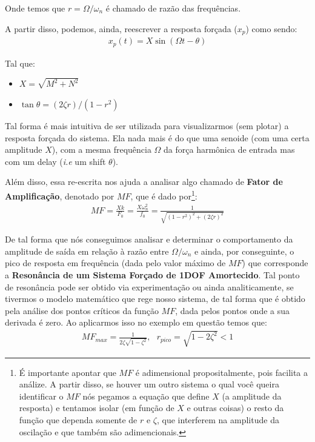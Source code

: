 \documentclass{article}
\begin{document}
Onde temos que $r = \Omega / \omega_n$ é chamado de razão das frequências.

A partir disso, podemos, ainda, reescrever a resposta forçada ($x_p$) como sendo:
\begin{align}
    x_p(t) = X\sin(\Omega t - \theta)
\end{align}

Tal que:
\begin{itemize}
    \item $X = \sqrt{M^2 + N^2}$
    \item $\tan{\theta} = (2\zeta r)/(1-r^2)$
\end{itemize}

Tal forma é mais intuitiva de ser utilizada para visualizarmos (sem plotar) a resposta forçada do sistema. Ela nada mais é do que uma senoide (com uma certa amplitude $X$), com a mesma
frequência $\Omega$ da força harmônica de entrada mas com um delay (\emph{i.e} um shift $\theta$).

Além disso, essa re-escrita nos ajuda a analisar algo chamado de \textbf{Fator de Amplificação}, denotado por \textbf{$MF$}, que é dado por\footnote{É importante apontar que $MF$ é
    adimensional propositalmente, pois facilita a análize. A partir disso, se houver um outro sistema o qual você queira identificar o $MF$ nós pegamos a equação que define $X$ (a amplitude da
    resposta) e tentamos isolar (em função de $X$ e outras coisas) o resto da função que dependa somente de $r$ e $\zeta$, que interferem na amplitude da oscilação e que também são adimencionais.}:
\begin{align}
    MF = \frac{Xk}{F_0} = \frac{X\omega_n^2}{f_0} = \frac{1}{\sqrt{(1 - r^2)^2 + (2\zeta r)^2}}\label{eq:fator_de_amplificacao}
\end{align}

De tal forma que nós conseguimos analisar e determinar o comportamento da amplitude de saída em relação à razão entre $\Omega/\omega_n$ e ainda, por conseguinte, o pico de resposta em frequência (dada pelo valor máximo de $MF$) que corresponde a \textbf{Resonância de um Sistema Forçado de 1DOF
    Amortecido}. Tal ponto de resonância pode ser obtido via experimentação ou ainda analiticamente, se tivermos o modelo matemático que rege nosso sistema, de tal forma que é obtido pela análise
dos pontos críticos da função $MF$, dada pelos pontos onde a sua derivada é zero. Ao aplicarmos isso no exemplo em questão temos que:
\begin{align}
    MF_{max} = \frac{1}{2\zeta\sqrt{1-\zeta^2}}, \ \ \ r_{pico} = \sqrt{1 - 2\zeta^2} < 1
\end{align}
\end{document}
